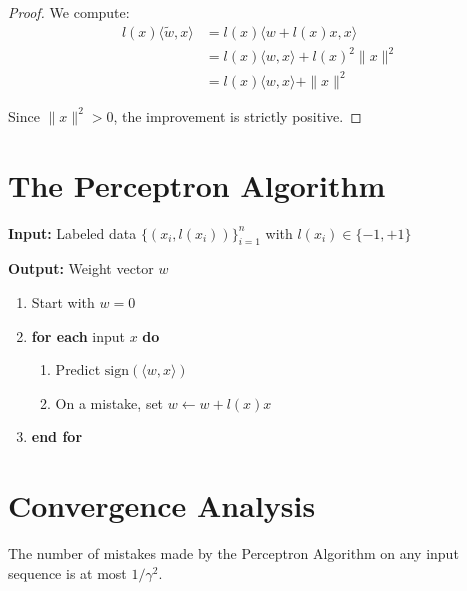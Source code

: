\documentclass[main.tex]{subfiles}
\begin{document}
\begin{proof}
We compute:
\begin{align}
l(x) \langle \tilde{w}, x \rangle &= l(x) \langle w + l(x)x, x \rangle \\[6pt]
&= l(x) \langle w, x \rangle + l(x)^2 \|x\|^2 \\[6pt]
&= l(x) \langle w, x \rangle + \|x\|^2
\end{align}

Since $\|x\|^2 > 0$, the improvement is strictly positive.
\end{proof}

\needspace{0.33\textheight}
\section{The Perceptron Algorithm}

\begin{algorithm}[Perceptron]
\textbf{Input:} Labeled data $\{(x_i, l(x_i))\}_{i=1}^n$ with $l(x_i) \in \{-1, +1\}$

\textbf{Output:} Weight vector $w$

\begin{enumerate}
    \item Start with $w = 0$
    \item \textbf{for each} input $x$ \textbf{do}
    \begin{enumerate}
        \item Predict $\text{sign}(\langle w, x \rangle)$
        \item On a mistake, set $w \leftarrow w + l(x)x$
    \end{enumerate}
    \item \textbf{end for}
\end{enumerate}
\end{algorithm}

\needspace{0.33\textheight}
\section{Convergence Analysis}

\begin{theorem}
The number of mistakes made by the Perceptron Algorithm on any input sequence is at most $1/\gamma^2$.
\end{theorem}
\end{document}
